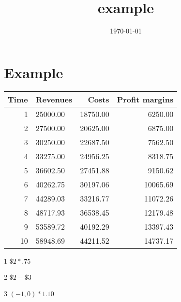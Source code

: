 \documentclass[11pt]{article}
\date{\today}
\title{example}
\begin{document}
\maketitle
\tableofcontents

\section{Example}
\label{sec-1}


\begin{table}
\centering
\begin{threeparttable}

\begin{tabular}{rlrr}
Time & Revenues & Costs\tnote{1} & Profit margins\tnote{2}\\
\hline
1 & 25000.00 & 18750.00 & 6250.00\\
2 & 27500.00\tnote{3} & 20625.00 & 6875.00\\
3 & 30250.00\tnote{3} & 22687.50 & 7562.50\\
4 & 33275.00\tnote{3} & 24956.25 & 8318.75\\
5 & 36602.50\tnote{3} & 27451.88 & 9150.62\\
6 & 40262.75\tnote{3} & 30197.06 & 10065.69\\
7 & 44289.03\tnote{3} & 33216.77 & 11072.26\\
8 & 48717.93\tnote{3} & 36538.45 & 12179.48\\
9 & 53589.72\tnote{3} & 40192.29 & 13397.43\\
10 & 58948.69\tnote{3} & 44211.52 & 14737.17\\
\hline
\end{tabular}

\begin{tablenotes}
\item [1] \(\$2*.75\)
\item [2] \(\$2-\$3\)
\item [3] \((-1,0)*1.10\)
\end{tablenotes}

\end{threeparttable}
\end{table}
\end{document}
